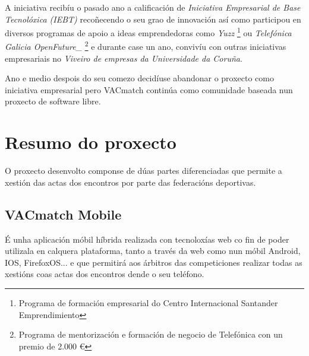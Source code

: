     A iniciativa recibíu o pasado ano a calificación de \emph{Iniciativa Empresarial de 
Base Tecnolóxica (IEBT)} recoñecendo o seu grao de innovación así como participou en 
diversos programas de apoio a ideas emprendedoras como \emph{Yuzz} 
\footnote{Programa de formación empresarial do Centro Internacional Santander 
Emprendimiento} ou \emph{Telefónica Galicia OpenFuture\_} \footnote{Programa de 
mentorización e formación de negocio de Telefónica con un premio de 2.000 
\euro{}} e durante case un ano, convivíu con 
outras iniciativas empresariais no \emph{Viveiro de empresas da Universidade da 
Coruña}.

    Ano e medio despois do seu comezo decidíuse abandonar o proxecto 
como iniciativa empresarial pero VACmatch continúa como comunidade baseada nun 
proxecto de software libre.

    \section{Resumo do proxecto}
    O proxecto desenvolto componse de dúas partes diferenciadas que permite a 
xestión das actas dos encontros por parte das federacións deportivas.
    
    \subsection{VACmatch Mobile}
    É unha aplicación móbil híbrida realizada con tecnoloxías web co fin de 
poder utilizala en calquera plataforma, tanto a través da web como nun móbil 
Android, IOS, FirefoxOS... e que permitirá aos árbitros das competiciones 
realizar todas as xestións coas actas dos encontros dende o seu teléfono.

